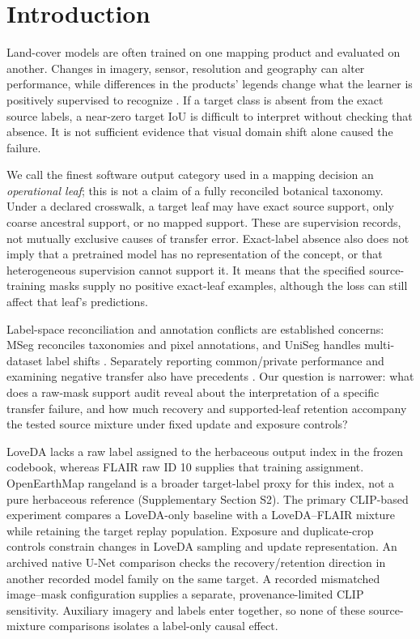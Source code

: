 \section{Introduction}
\label{sec:introduction}
Land-cover models are often trained on one mapping product and evaluated on another. Changes in imagery, sensor, resolution and geography can alter performance, while differences in the products' legends change what the learner is positively supervised to recognize \citep{tuia2016domain,bruzzone2009domain,yang2017harmonization}. If a target class is absent from the exact source labels, a near-zero target IoU is difficult to interpret without checking that absence. It is not sufficient evidence that visual domain shift alone caused the failure.

We call the finest software output category used in a mapping decision an \emph{operational leaf}; this is not a claim of a fully reconciled botanical taxonomy. Under a declared crosswalk, a target leaf may have exact source support, only coarse ancestral support, or no mapped support. These are supervision records, not mutually exclusive causes of transfer error. Exact-label absence also does not imply that a pretrained model has no representation of the concept, or that heterogeneous supervision cannot support it. It means that the specified source-training masks supply no positive exact-leaf examples, although the loss can still affect that leaf's predictions.

Label-space reconciliation and annotation conflicts are established concerns: MSeg reconciles taxonomies and pixel annotations, and UniSeg handles multi-dataset label shifts \citep{lambert2020mseg,kim2022uniseg}. Separately reporting common/private performance and examining negative transfer also have precedents \citep{choe2024bus,choe2025unida,ren2026sats}. Our question is narrower: what does a raw-mask support audit reveal about the interpretation of a specific transfer failure, and how much recovery and supported-leaf retention accompany the tested source mixture under fixed update and exposure controls?

LoveDA lacks a raw label assigned to the herbaceous output index in the frozen codebook, whereas FLAIR raw ID 10 supplies that training assignment. OpenEarthMap rangeland is a broader target-label proxy for this index, not a pure herbaceous reference (Supplementary Section S2). The primary CLIP-based experiment compares a LoveDA-only baseline with a LoveDA--FLAIR mixture while retaining the target replay population. Exposure and duplicate-crop controls constrain changes in LoveDA sampling and update representation. An archived native U-Net comparison checks the recovery/retention direction in another recorded model family on the same target. A recorded mismatched image--mask configuration supplies a separate, provenance-limited CLIP sensitivity. Auxiliary imagery and labels enter together, so none of these source-mixture comparisons isolates a label-only causal effect.

